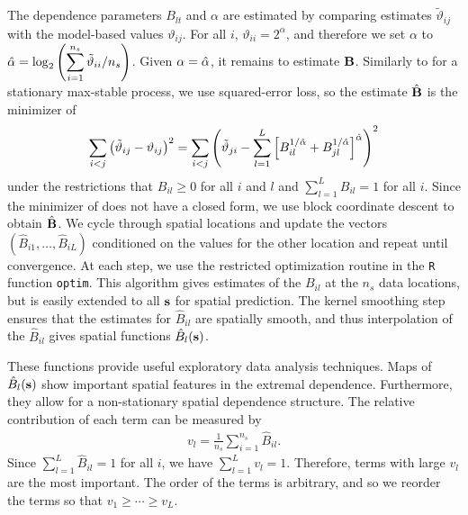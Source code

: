 \documentclass[11pt]{article}
\begin{document}
The dependence parameters $B_{lt}$ and $\alpha$ are estimated by comparing estimates ${\tilde \vartheta}_{ij}$ with the model-based values $\vartheta_{ij}$.
For all $i$, $\vartheta_{ii} = 2^{\alpha}$, and therefore we set $\alpha$ to $\hat{\alpha} = \log_2\left(\displaystyle \sum_{i=1}^{n_s}{\tilde \vartheta}_{ii}/n_s\right)$.
Given $\alpha=\hat{\alpha}$, it remains to estimate $\mbox{\bf B}$.
Similarly to \citet{Smith1990} for a stationary max-stable process, we use squared-error loss, so the estimate $\hat{\mbox{\bf B}}$ is the minimizer of
\begin{align} \label{ebeq:Bhat}
\sum_{i<j} \left({\tilde \vartheta}_{ij} - \vartheta_{ij}\right)^2
  =
  \sum_{i<j} \left({\tilde \vartheta}_{ji} - \sum_{l=1}^L \left[B_{il}^{1/\hat{\alpha}} + B_{jl}^{1/\hat{\alpha}} \right]^{\hat{\alpha}}\right)^2
\end{align}
under the restrictions that $B_{il}\ge 0$ for all $i$ and $l$ and $\displaystyle \sum_{l=1}^LB_{il}=1$ for all $i$.
Since the minimizer of  does not have a closed form, we use block coordinate descent to obtain ${\hat {\mbox{\bf B}}}$.
We cycle through spatial locations and update the vectors $\left(\hat{B}_{i1},\ldots,\hat{B}_{iL}\right)$ conditioned on the values for the other location and repeat until convergence.
At each step, we use the restricted optimization routine in the \texttt{R} function \texttt{optim}.
This algorithm gives estimates of the $B_{il}$ at the $n_s$ data locations, but is easily extended to all $\mbox{\bf s}$ for spatial prediction.
The kernel smoothing step ensures that the estimates for $\hat{B}_{il}$ are spatially smooth, and thus interpolation of the $\hat{B}_{il}$ gives spatial functions $\hat{B}_l(\mbox{\bf s})$.

These functions provide useful exploratory data analysis techniques.
Maps of $\hat{B}_l(\mbox{\bf s})$ show important spatial features in the extremal dependence.
Furthermore, they allow for a non-stationary spatial dependence structure.
The relative contribution of each term can be measured by
\begin{align} \label{ebeq:v}
v_l = \frac{1}{n_s}\sum_{i=1}^{n_s}{\hat B}_{il}.
\end{align}
Since $\displaystyle \sum_{l=1}^L{\hat B}_{il}=1$ for all $i$, we have $\displaystyle \sum_{l=1}^Lv_l = 1$.
Therefore, terms with large $v_l$ are the most important.
The order of the terms is arbitrary, and so we reorder the terms so that $v_1\ge \cdots \ge v_L$.
\end{document}

